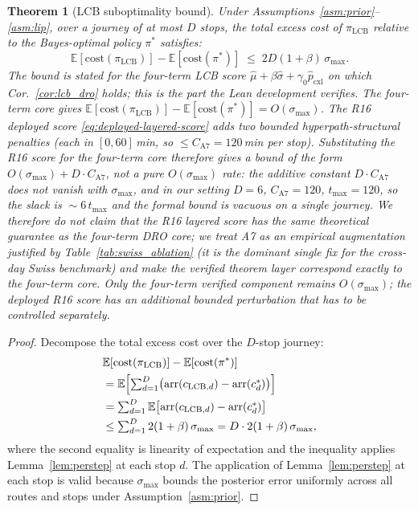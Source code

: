 \documentclass[11pt]{article}
\newtheorem{theorem}{Theorem}
\theoremstyle{definition}
\theoremstyle{remark}
\begin{document}
\begin{theorem}[LCB suboptimality bound]\label{thm:lcb_bound}
Under Assumptions~\ref{asm:prior}--\ref{asm:lip},
over a journey of at most $D$ stops, the total excess cost of $\pi_{\mathrm{LCB}}$
relative to the Bayes-optimal policy $\pi^*$ satisfies:
\begin{equation}
\mathbb{E}[\mathrm{cost}(\pi_{\mathrm{LCB}})] - \mathbb{E}[\mathrm{cost}(\pi^*)]
\;\leq\; 2D(1+\beta)\,\sigma_{\max}.
\label{eq:lcb_bound}
\end{equation}
The bound is stated for the four-term LCB score
$\hat\mu + \beta\hat\sigma + \gamma_0\hat p_{\mathrm{cxl}}$
on which Cor.~\ref{cor:lcb_dro} holds; this is the part the Lean
development verifies. The four-term core gives
$\mathbb{E}[\mathrm{cost}(\pi_{\mathrm{LCB}})] -
\mathbb{E}[\mathrm{cost}(\pi^*)] = O(\sigma_{\max})$. The R16 deployed
score \eqref{eq:deployed-layered-score} adds two bounded hyperpath-structural
penalties (each in $[0, 60]$\,min, so $\leq C_{\mathrm{A7}}=120$\,min
per stop). Substituting the R16 score for the four-term core therefore
gives a bound of the form
$O(\sigma_{\max}) + D \cdot C_{\mathrm{A7}}$, \emph{not} a pure
$O(\sigma_{\max})$ rate: the additive constant $D \cdot C_{\mathrm{A7}}$
does not vanish with $\sigma_{\max}$, and in our setting
$D{=}6$, $C_{\mathrm{A7}}{=}120$, $t_{\max}{=}120$, so the slack is
$\!\sim\!6\,t_{\max}$ and the formal bound is vacuous on a single
journey. We therefore do \emph{not} claim that the R16 layered score
has the same theoretical guarantee as the four-term DRO core; we treat
A7 as an empirical augmentation justified by
Table~\ref{tab:swiss_ablation} (it is the dominant single fix for the
cross-day Swiss benchmark) and make the verified theorem layer
correspond exactly to the four-term core. Only the four-term verified
component remains $O(\sigma_{\max})$; the deployed R16 score has an
additional bounded perturbation that has to be controlled separately.
\end{theorem}

\begin{proof}
Decompose the total excess cost over the $D$-stop journey:
\begin{align}
&\mathbb{E}[\mathrm{cost}(\pi_{\mathrm{LCB}})] - \mathbb{E}[\mathrm{cost}(\pi^*)] \notag \\
&= \mathbb{E}\Bigl[\textstyle\sum_{d=1}^{D}
   \bigl(\mathrm{arr}(c_{\mathrm{LCB},d}) - \mathrm{arr}(c^*_d)\bigr)\Bigr] \notag \\
&= \textstyle\sum_{d=1}^{D}
   \mathbb{E}\bigl[\mathrm{arr}(c_{\mathrm{LCB},d}) - \mathrm{arr}(c^*_d)\bigr]
   \notag \\
&\leq \textstyle\sum_{d=1}^{D} 2(1+\beta)\,\sigma_{\max}
   = D \cdot 2(1+\beta)\,\sigma_{\max},
\end{align}
where the second equality is linearity of expectation and the inequality
applies Lemma~\ref{lem:perstep} at each stop $d$.
The application of Lemma~\ref{lem:perstep} at each stop is valid because
$\sigma_{\max}$ bounds the posterior error uniformly across all routes and stops
under Assumption~\ref{asm:prior}.
\end{proof}
\end{document}
